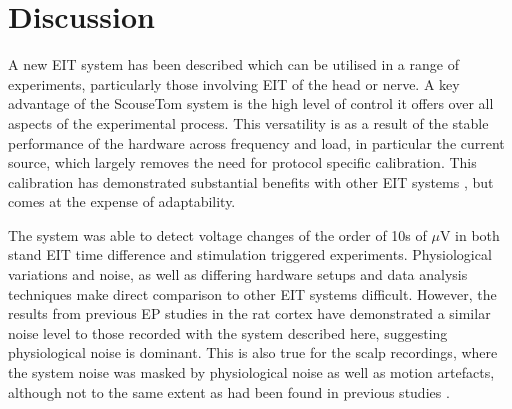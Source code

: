 \section{Discussion}
A new EIT system has been described which can be utilised in a range of experiments, particularly those involving EIT of the head or nerve. A key advantage of the ScouseTom system is the high level of control it offers over all aspects of the experimental process. This versatility is as a result of the stable performance of the hardware across frequency and load, in particular the current source, which largely removes the need for protocol specific calibration. This calibration has demonstrated substantial benefits with other EIT systems \cite{Hun_Wi_2014} \cite{khan}, but comes at the expense of adaptability.

The system was able to detect voltage changes of the order of 10s of $\mu$V in both stand EIT time difference and stimulation triggered experiments. Physiological variations and noise, as well as differing hardware setups and data analysis techniques make direct comparison to other EIT systems difficult. However, the results from previous EP studies \cite{Oh2011} in the rat cortex have demonstrated a similar noise level to those recorded with the system described here, suggesting physiological noise is dominant. This is also true for the scalp recordings, where the system noise was masked by physiological noise as well as motion artefacts, although not to the same extent as had been found in previous studies \cite{Fabrizi_2006}. 
